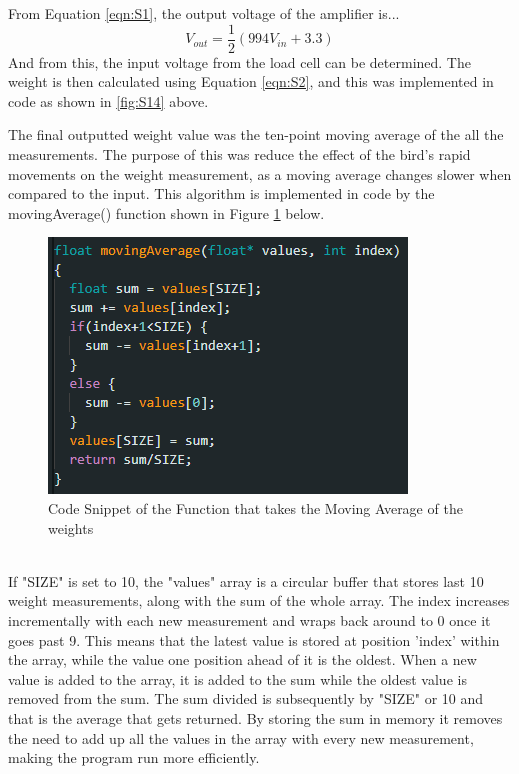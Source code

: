 \documentclass[class=report,11pt,crop=false]{standalone}
\begin{document}
	From Equation \ref{eqn:S1}, the output voltage of the amplifier is...
	\[V_{out} = \frac{1}{2}\left(994V_{in} + 3.3\right) \]
	And from this, the input voltage from the load cell can be determined. The weight is then calculated using Equation \ref{eqn:S2}, and this was implemented in code as shown in \ref{fig:S14} above.
	
	The final outputted weight value was the ten-point moving average of the all the measurements. The purpose of this was reduce the effect of the bird's rapid movements on the weight measurement, as a moving average changes slower when compared to the input. This algorithm is implemented in code by the movingAverage() function shown in Figure \ref{fig:S15} below.
	\begin{figure}[h!]
		\centering
		\includegraphics[width=0.5\linewidth]{Figures/MovingAverage.png}
		\caption{Code Snippet of the Function that takes the Moving Average of the weights}
		\label{fig:S15}
	\end{figure} \\
	If "SIZE" is set to 10, the "values" array is a circular buffer that stores last 10 weight measurements, along with the sum of the whole array. The index increases incrementally with each new measurement and wraps back around to 0 once it goes past 9. This means that the latest value is stored at position 'index' within the array, while the value one position ahead of it is the oldest. When a new value is added to the array, it is added to the sum while the oldest value is removed from the sum. The sum divided is subsequently by "SIZE" or 10 and that is the average that gets returned. By storing the sum in memory it removes the need to add up all the values in the array with every new measurement, making the program run more efficiently.
	
\end{document}
